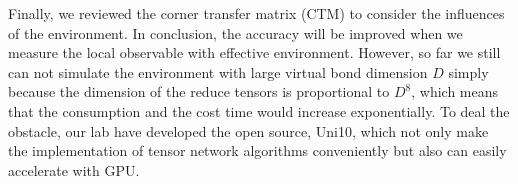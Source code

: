 Finally, we reviewed the corner transfer matrix (CTM) to consider the influences of the environment. In conclusion, the accuracy will be improved when we measure the local observable with effective environment. However, so far we still can not simulate the environment with large virtual bond dimension $D$ simply because the dimension of the reduce tensors is proportional to $D^8$, which means that the consumption and the cost time would increase exponentially. To deal the obstacle, our lab have developed the open source, Uni10, which not only make the implementation of tensor network algorithms conveniently but also can easily accelerate with GPU.

